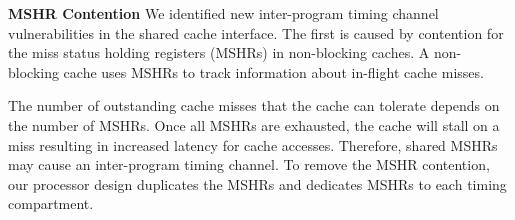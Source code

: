 
\textbf{MSHR Contention}
We identified new inter-program timing channel vulnerabilities in the shared cache 
interface. The first is caused by contention for the miss status holding 
registers (MSHRs) in non-blocking caches.
A non-blocking cache uses MSHRs to track information about in-flight cache 
misses. %

The number of outstanding cache misses that the cache can tolerate depends on 
the number of MSHRs. Once all MSHRs are exhausted, the cache will stall on
a miss resulting in increased latency for cache accesses.
Therefore, shared MSHRs may cause an inter-program timing channel.
To remove the MSHR contention, our processor design duplicates
the MSHRs and dedicates MSHRs to each timing compartment.

